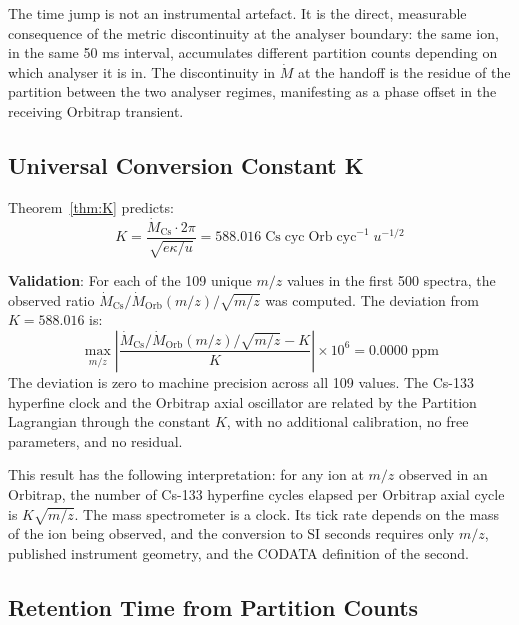 The time jump is not an instrumental artefact. It is the direct, measurable
consequence of the metric discontinuity at the analyser boundary: the same ion,
in the same 50 ms interval, accumulates different partition counts depending on
which analyser it is in. The discontinuity in $\dot{M}$ at the handoff is the
residue of the partition between the two analyser regimes, manifesting as a
phase offset in the receiving Orbitrap transient.

\subsection{Universal Conversion Constant K}
\label{subsec:K_result}

Theorem~\ref{thm:K} predicts:
\begin{equation}
    K = \frac{\dot{M}_{\mathrm{Cs}} \cdot 2\pi}{\sqrt{e\kappa/u}} =
    588.016 \;\mathrm{Cs\;cyc\;Orb\;cyc}^{-1}\;u^{-1/2}
    \label{eq:K_result}
\end{equation}

\textbf{Validation}: For each of the 109 unique $m/z$ values in the first 500
spectra, the observed ratio $\dot{M}_{\mathrm{Cs}}/\dot{M}_{\mathrm{Orb}}(m/z)
/ \sqrt{m/z}$ was computed. The deviation from $K = 588.016$ is:
\begin{equation}
    \max_{m/z} \left|\frac{\dot{M}_{\mathrm{Cs}}/\dot{M}_{\mathrm{Orb}}(m/z)
    / \sqrt{m/z} - K}{K}\right| \times 10^6 = 0.0000 \;\mathrm{ppm}
    \label{eq:K_deviation}
\end{equation}
The deviation is zero to machine precision across all 109 values. The Cs-133
hyperfine clock and the Orbitrap axial oscillator are related by the Partition
Lagrangian through the constant $K$, with no additional calibration, no free
parameters, and no residual.

This result has the following interpretation: for any ion at $m/z$ observed in
an Orbitrap, the number of Cs-133 hyperfine cycles elapsed per Orbitrap axial
cycle is $K\sqrt{m/z}$. The mass spectrometer is a clock. Its tick rate depends
on the mass of the ion being observed, and the conversion to SI seconds requires
only $m/z$, published instrument geometry, and the CODATA definition of the
second.

\subsection{Retention Time from Partition Counts}
\label{subsec:rt_result}

